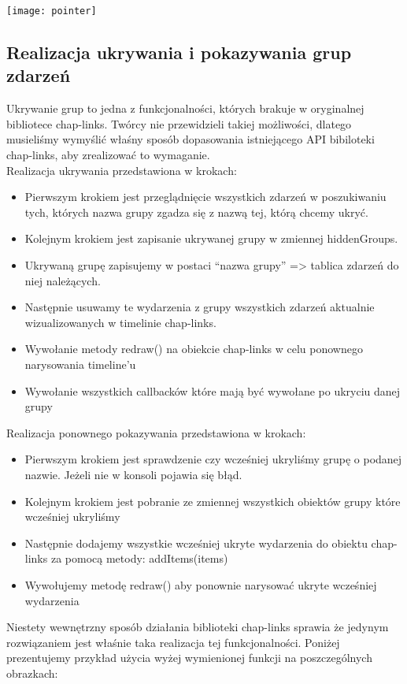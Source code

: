\documentclass[polish,12pt]{aghthesis}
\begin{document}
\texttt{[image: pointer]}


\subsection{Realizacja ukrywania i pokazywania grup zdarzeń}

Ukrywanie grup to jedna z funkcjonalności, których brakuje w oryginalnej bibliotece chap-links. Twórcy nie przewidzieli takiej możliwości, dlatego musieliśmy wymyślić właśny sposób dopasowania istniejącego API bibiloteki chap-links, aby zrealizować to wymaganie.\\

Realizacja ukrywania przedstawiona w krokach:
\begin{itemize}
	\item Pierwszym krokiem jest przeglądnięcie wszystkich zdarzeń w poszukiwaniu tych, których nazwa grupy zgadza się z nazwą tej, którą chcemy ukryć. 
	\item Kolejnym krokiem jest zapisanie ukrywanej grupy w zmiennej hiddenGroups.
	\item Ukrywaną grupę zapisujemy w postaci “nazwa grupy” => tablica zdarzeń do niej należących.
	\item Następnie usuwamy te wydarzenia z grupy wszystkich zdarzeń aktualnie wizualizowanych w timelinie chap-links.
	\item Wywołanie metody redraw() na obiekcie chap-links w celu ponownego narysowania timeline’u
	\item Wywołanie wszystkich callbacków które mają być wywołane po ukryciu danej grupy
\end{itemize}

Realizacja ponownego pokazywania przedstawiona w krokach:
\begin{itemize}
	\item Pierwszym krokiem jest sprawdzenie czy wcześniej ukryliśmy grupę o podanej nazwie. Jeżeli nie w konsoli pojawia się błąd.
	\item Kolejnym krokiem jest pobranie ze zmiennej wszystkich obiektów grupy które wcześniej ukryliśmy
	\item Następnie dodajemy wszystkie wcześniej ukryte wydarzenia do obiektu chap-links za pomocą metody: addItems(items)
	\item Wywołujemy metodę redraw() aby ponownie narysować ukryte wcześniej wydarzenia 
\end{itemize}

Niestety wewnętrzny sposób działania biblioteki chap-links sprawia że jedynym rozwiązaniem jest właśnie taka realizacja tej funkcjonalności.
Poniżej prezentujemy przykład użycia wyżej wymienionej funkcji na poszczególnych obrazkach:\\ 
\end{document}
